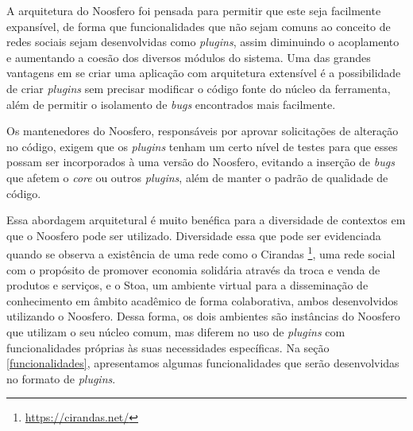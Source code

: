 
A arquitetura do Noosfero foi pensada para permitir que este seja facilmente
expansível, de forma que funcionalidades que não sejam comuns ao conceito de
redes sociais sejam desenvolvidas como \textit{plugins}, assim diminuindo
o acoplamento e aumentando a coesão dos diversos módulos do sistema.
%
Uma das grandes vantagens em se criar uma aplicação com arquitetura extensível
é a possibilidade de criar \textit{plugins} sem precisar modificar o código
fonte do núcleo da ferramenta, além de permitir o isolamento de
\textit{bugs} encontrados mais facilmente.

Os mantenedores do Noosfero, responsáveis por aprovar solicitações de
alteração no código, exigem que os \textit{plugins} tenham um certo nível de
testes para que esses possam ser incorporados à uma versão do Noosfero, 
evitando a inserção de \textit{bugs} que afetem o \textit{core} ou
outros \textit{plugins}, além de manter o padrão de qualidade de código.

Essa abordagem arquitetural é muito benéfica para a diversidade de contextos
em que o Noosfero pode ser utilizado. Diversidade essa que pode ser evidenciada
quando se observa a existência de uma rede como o Cirandas%
\footnote{\url{https://cirandas.net/}},
uma rede social com o propósito de promover economia solidária através
da troca e venda de produtos e serviços, e o
Stoa, um ambiente virtual para a disseminação de conhecimento em âmbito
acadêmico de forma colaborativa, ambos desenvolvidos utilizando o Noosfero.
%
Dessa forma, os dois ambientes são instâncias do Noosfero que utilizam o seu núcleo comum,
mas diferem no uso de \textit{plugins} com funcionalidades próprias às suas necessidades específicas.
%
Na seção \ref{funcionalidades}, apresentamos algumas funcionalidades que serão
desenvolvidas no formato de \textit{plugins}.


